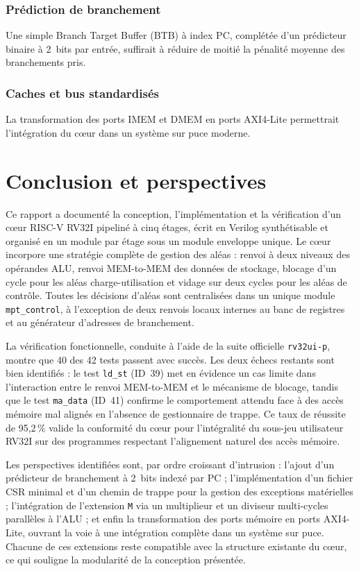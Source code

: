 \documentclass[11pt,a4paper,oneside]{report}
\begin{document}
\subsection{Prédiction de branchement}
Une simple Branch Target Buffer (BTB) à index PC, complétée d'un
prédicteur binaire à 2~bits par entrée, suffirait à réduire de
moitié la pénalité moyenne des branchements pris.

\subsection{Caches et bus standardisés}
La transformation des ports IMEM et DMEM en ports AXI4-Lite
permettrait l'intégration du c\oe{}ur dans un système sur puce
moderne.


\chapter{Conclusion et perspectives}
\label{ch:conclusion}

Ce rapport a documenté la conception, l'implémentation et la
vérification d'un c\oe{}ur RISC-V RV32I pipeliné à cinq étages,
écrit en Verilog synthétisable et organisé en un module par étage
sous un module enveloppe unique. Le c\oe{}ur incorpore une
stratégie complète de gestion des aléas : renvoi à deux niveaux
des opérandes ALU, renvoi MEM-to-MEM des données de stockage,
blocage d'un cycle pour les aléas charge-utilisation et vidage
sur deux cycles pour les aléas de contrôle. Toutes les décisions
d'aléas sont centralisées dans un unique module
\texttt{mpt\_control}, à l'exception de deux renvois locaux
internes au banc de registres et au générateur d'adresses de
branchement.

La vérification fonctionnelle, conduite à l'aide de la suite
officielle \texttt{rv32ui-p}, montre que 40 des 42 tests passent
avec succès. Les deux échecs restants sont bien identifiés : le
test \texttt{ld\_st} (ID~39) met en évidence un cas limite dans
l'interaction entre le renvoi MEM-to-MEM et le mécanisme de
blocage, tandis que le test \texttt{ma\_data} (ID~41) confirme le
comportement attendu face à des accès mémoire mal alignés en
l'absence de gestionnaire de trappe. Ce taux de réussite de
95,2\,\% valide la conformité du c\oe{}ur pour l'intégralité du
sous-jeu utilisateur RV32I sur des programmes respectant
l'alignement naturel des accès mémoire.

Les perspectives identifiées sont, par ordre croissant
d'intrusion : l'ajout d'un prédicteur de branchement à 2~bits
indexé par PC ; l'implémentation d'un fichier CSR minimal et d'un
chemin de trappe pour la gestion des exceptions matérielles ;
l'intégration de l'extension \texttt{M} via un multiplieur et un
diviseur multi-cycles parallèles à l'ALU ; et enfin la
transformation des ports mémoire en ports AXI4-Lite, ouvrant la
voie à une intégration complète dans un système sur puce.
Chacune de ces extensions reste compatible avec la structure
existante du c\oe{}ur, ce qui souligne la modularité de la
conception présentée.
\end{document}
